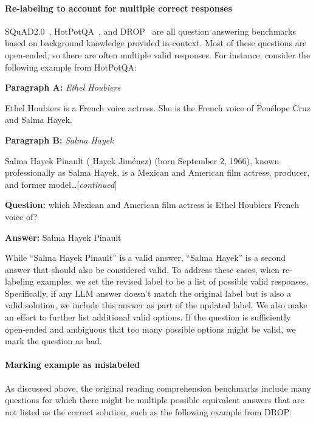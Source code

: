 \paragraph{Re-labeling to account for multiple correct responses} SQuAD2.0~\cite{rajpurkar2018know}, HotPotQA~\citep{yang2018hotpotqa}, and DROP~\citep{dua2019drop} are all question answering benchmarks based on background knowledge provided in-context. Most of these questions are open-ended, so there are often multiple valid responses. For instance, consider the following example from HotPotQA:
\\
\begin{tcolorbox}[colback=gray!6, colframe=gray!50, arc=2mm, boxrule=0.5pt]
    \textbf{Paragraph A:} \textit{Ethel Houbiers}
    
    Ethel Houbiers is a French voice actress.  She is the French voice of Penélope Cruz and Salma Hayek.
    
    \medskip
    
    \textbf{Paragraph B:} \textit{Salma Hayek}
    
    Salma Hayek Pinault ( Hayek Jiménez) (born September 2, 1966), known professionally as Salma Hayek, is a Mexican and American film actress, producer, and former model\ldots[\textit{continued}]
    
    \medskip
    
    \textbf{Question:} which Mexican and American film actress is Ethel Houbiers French voice of?
    
    \medskip
    
    \textbf{Answer:} Salma Hayek Pinault

\end{tcolorbox}
\vspace{\baselineskip}
 
\noindent While ``Salma Hayek Pinault'' is a valid answer, ``Salma Hayek'' is a second answer that should also be considered valid. To address these cases, when re-labeling examples, we set the revised label to be a list of possible valid responses. Specifically, if any LLM answer doesn't match the original label but is also a valid solution, we include this answer as part of the updated label. We also make an effort to further list additional valid options. If the question is sufficiently open-ended and ambiguous that too many possible options might be valid, we mark the question as bad. 

\paragraph{Marking example as mislabeled} As discussed above, the original reading comprehension benchmarks include many questions for which there might be multiple possible equivalent answers that are not listed as the correct solution, such as the following example from DROP:

